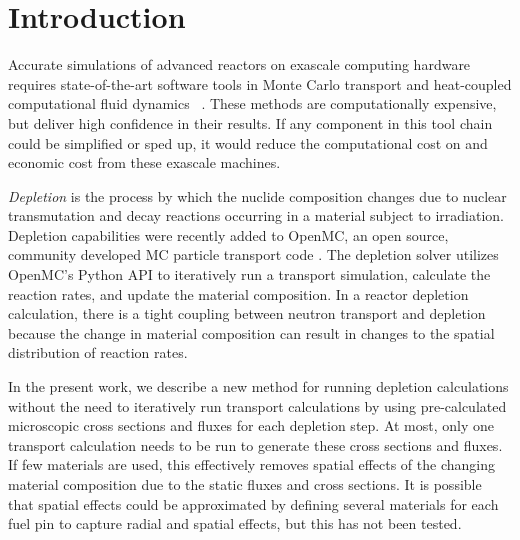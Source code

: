 \section{Introduction}\label{}

    Accurate simulations of advanced reactors on exascale computing hardware
    requires state-of-the-art software tools in Monte Carlo transport and
    heat-coupled computational fluid dynamics
    ~\citep{romano2021nse,merzari2023sc}.  These methods are computationally
    expensive, but deliver high confidence in their results. If any component in
    this tool chain could be simplified or sped up, it would reduce the
    computational cost on and economic cost from these exascale machines.

    {\it Depletion} is the process by which the nuclide composition changes due
    to nuclear transmutation and decay reactions occurring in a material subject
    to irradiation. Depletion capabilities were recently added to OpenMC, an
    open source, community developed MC particle transport code
    \citep{romano_openmc_2015, romano_depletion_2021}. The depletion solver
    utilizes OpenMC's Python API to iteratively run a transport simulation,
    calculate the reaction rates, and update the material composition.
    In a reactor depletion calculation, there is a tight coupling between
    neutron transport and depletion because the change in material composition
    can result in changes to the spatial distribution of reaction rates.

    In the present work, we describe a new method for running depletion
    calculations without the need to iteratively run transport calculations by
    using pre-calculated microscopic cross sections and fluxes for each depletion
    step. At most, only one transport calculation needs to be run to generate
    these cross sections and fluxes. If few materials are used, this effectively
    removes spatial effects of the changing material composition due to the
    static fluxes and cross sections. It is possible that spatial effects could
    be approximated by defining several materials for each fuel pin to capture
    radial and spatial effects, but this has not been tested.

